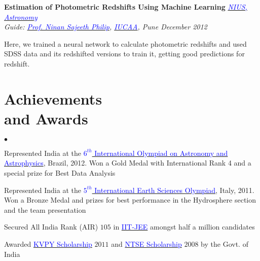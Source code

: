 \documentclass[margin,line]{res}
\newenvironment{list1}{
  \begin{list}{\ding{113}}{%
      \setlength{\itemsep}{0in}
      \setlength{\parsep}{0in} \setlength{\parskip}{0in}
      \setlength{\topsep}{0in} \setlength{\partopsep}{0in} 
      \setlength{\leftmargin}{0.17in}}}{\end{list}}
\newenvironment{list2}{
  \begin{list}{$\bullet$}{%
      \setlength{\itemsep}{0in}
      \setlength{\parsep}{0in} \setlength{\parskip}{0in}
      \setlength{\topsep}{0in} \setlength{\partopsep}{0in} 
      \setlength{\leftmargin}{0.18in}}}{\end{list}}
\begin{document}
\begin{resume}
\vspace*{-0.13in}

{\bf Estimation of Photometric Redshifts Using Machine Learning} \hfill \textit{\href{http://nius.hbcse.tifr.res.in/}{\textcolor{blue} {NIUS, Astronomy}}} \\
{\em Guide: \href{http://www.iucaa.ernet.in/~nspp/}{\textcolor{blue}{Prof. Ninan Sajeeth Philip}}, \href{http://www.iucaa.ernet.in/}{\textcolor{blue} {IUCAA}}, Pune \hfill December 2012} \\
\vspace*{-.15in}
\begin{list1}
\item[] Here, we trained a neural network to calculate photometric redshifts and used SDSS data and its redshifted versions to train it, getting good predictions for redshift.
\end{list1}

\vspace*{-0.13in}

\section{\sc Achievements \\and Awards}
\begin{list2}
\item Represented India at the \href{http://www.ioaa2012.ufrj.br/}{\textcolor{blue} {$6^{th}$ International Olympiad on Astronomy and Astrophysics}}, Brazil, 2012. Won a Gold Medal with International Rank 4 and a special prize for Best Data Analysis
\item Represented India at the \href{http://www.ieso2011.unimore.it/}{\textcolor{blue} {$5^{th}$ International Earth Sciences Olympiad}}, Italy, 2011. Won a Bronze Medal and prizes for best performance in the Hydrosphere section and the team presentation
\item  Secured All India Rank (AIR) $105$ in \href{https://en.wikipedia.org/wiki/Indian_Institute_of_Technology_Joint_Entrance_Examination}{\textcolor{blue}{IIT-JEE}} amongst half a million candidates
\item Awarded \href{http://www.kvpy.iisc.ernet.in/main/index.htm}{\textcolor{blue}{KVPY Scholarship}} $2011$ and \href{http://www.ncert.nic.in/programmes/talent_exam/index_talent.html}{\textcolor{blue}{NTSE Scholarship}} $2008$ by the Govt. of India
\end{list2}


\end{resume}
\end{document}
